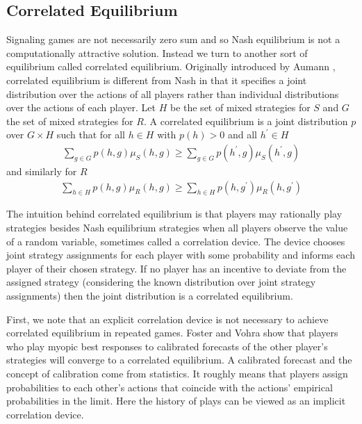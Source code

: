 \documentclass{article}
\begin{document}
\subsection{Correlated Equilibrium}

Signaling games are not necessarily zero sum and so Nash equilibrium is not a computationally attractive solution. Instead we turn to another sort of equilibrium called correlated equilibrium. Originally introduced by Aumann \cite{aumann1974subjectivity}\cite{aumann1987correlated}, correlated equilibrium is different from Nash in that it specifies a joint distribution over the actions of all players rather than individual distributions over the actions of each player. Let $H$ be the set of mixed strategies for $S$ and $G$ the set of mixed strategies for $R$. A correlated equilibrium is a joint distribution $p$ over $G \times H$ such that for all $h\in H$ with $p(h) > 0$ and all $h^\prime \in H$
\begin{align*}
\sum_{g \in G} p(h,g)\mu_S(h, g) \ge \sum_{g \in G} p(h^\prime,g)\mu_S(h^\prime, g)
\end{align*}
\noindent and similarly for $R$
\begin{align*}
\sum_{h \in H} p(h,g)\mu_R(h, g) \ge \sum_{h \in H} p(h,g^\prime)\mu_R(h, g^\prime)
\end{align*}

The intuition behind correlated equilibrium is that players may rationally play strategies besides Nash equilibrium strategies when all players observe the value of a random variable, sometimes called a correlation device. The device chooses joint strategy assignments for each player with some probability and informs each player of their chosen strategy. If no player has an incentive to deviate from the assigned strategy (considering the known distribution over joint strategy assignments) then the joint distribution is a correlated equilibrium.

First, we note that an explicit correlation device is not necessary to achieve correlated equilibrium in repeated games. Foster and Vohra \cite{foster1997calibrated} show that players who play myopic best responses to calibrated forecasts of the other player's strategies will converge to a correlated equilibrium. A calibrated forecast and the concept of calibration come from statistics. It roughly means that players assign probabilities to each other's actions that coincide with the actions' empirical probabilities in the limit. Here the history of plays can be viewed as an implicit correlation device.
\end{document}
